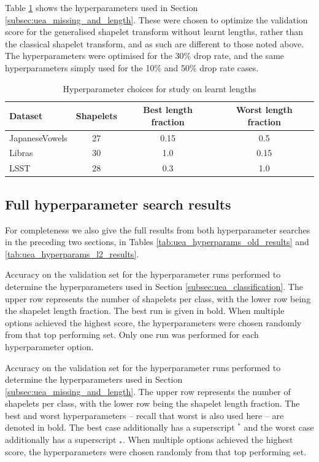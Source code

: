 \documentclass{article}
\theoremstyle{plain}
\theoremstyle{definition}
\begin{document}
	Table \ref{tab:uea_hyperparams_l2} shows the hyperparameters used in Section \ref{subsec:uea_missing_and_length}. These were chosen to optimize the validation score for the generalised shapelet transform without learnt lengths, rather than the classical shapelet transform, and as such are different to those noted above. The hyperparameters were optimised for the 30\% drop rate, and the same hyperparameters simply used for the 10\% and 50\% drop rate cases.

	\begin{table}[ht]
		\caption{Hyperparameter choices for study on learnt lengths}
		\label{tab:uea_hyperparams_l2}
		\centering
		\begin{tabular}{lccc}
			\toprule
			Dataset & Shapelets & Best length fraction & Worst length fraction \\
			\midrule
			JapaneseVowels  & 27 & 0.15 & 0.5 \\
			Libras          & 30 & 1.0 & 0.15 \\
			LSST            & 28 & 0.3 & 1.0 \\
			\bottomrule
		\end{tabular}
	\end{table}
	
	\subsection{Full hyperparameter search results}
	For completeness we also give the full results from both hyperparameter searches in the preceding two sections, in Tables \ref{tab:uea_hyperparams_old_results} and \ref{tab:uea_hyperparams_l2_results}.

	\begin{table}
		\centering
		
		\caption{Accuracy on the validation set for the hyperparameter runs performed to determine the hyperparameters used in Section \ref{subsec:uea_classification}. The upper row represents the number of shapelets per class, with the lower row being the shapelet length fraction. The best run is given in bold. When multiple options achieved the highest score, the hyperparameters were chosen randomly from that top performing set. Only one run was performed for each hyperparameter option.}\label{tab:uea_hyperparams_old_results}

		\bigskip\bigskip  %

		\centering
		
		\caption{Accuracy on the validation set for the hyperparameter runs performed to determine the hyperparameters used in Section \ref{subsec:uea_missing_and_length}. The upper row represents the number of shapelets per class, with the lower row being the shapelet length fraction. The best and worst hyperparameters -- recall that worst is also used here -- are denoted in bold. The best case additionally has a superscript $^*$ and the worst case additionally has a superscript $_*$. When multiple options achieved the highest score, the hyperparameters were chosen randomly from that top performing set.}\label{tab:uea_hyperparams_l2_results}
	\end{table}
\end{document}
